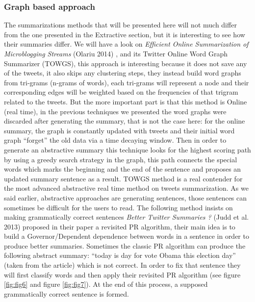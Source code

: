 \documentclass[runningheads]{llncs}
\begin{document}
\subsubsection{Graph based approach}

The summarizations methods that will be presented here will not much differ
from the one presented in the Extractive section, but it is interesting to see
how their summaries differ. We will have a look on \textit{Efficient Online
Summarization of Microblogging Streams} (Olariu 2014)
\cite{olariu_efficient_2014}, and its Twitter Online Word Graph Summarizer
(TOWGS), this approach is interesting because it does not save any of the
tweets, it also skips any clustering steps, they instead build word graphs from
tri-grams (n-grams of words), each tri-grams will represent a node and their
corresponding edges will be weighted based on the frequencies of that trigram
related to the tweets. But the more important part is that this method is
Online (real time), in the previous techniques we presented the word graphs
were discarded after generating the summary, that is not the case here: for the
online summary, the graph is constantly updated with tweets and their initial
word graph ``forget'' the old data via a time decaying window. Then in order to
generate an abstractive summary this technique looks for the highest scoring
path by using a greedy search strategy in the graph, this path connects the
special words which marks the beginning and the end of the sentence and
proposes an updated summary sentence as a result. TOWGS method is a real
contender for the most advanced abstractive real time method on tweets
summarization. As we said earlier, abstractive approaches are generating
sentences, those sentences can sometimes be difficult for the users to read.
The following method insists on making grammatically correct sentences
\textit{Better Twitter Summaries ?} (Judd et al. 2013) \cite{judd_better_2013}
proposed in their paper a revisited PR algorithm, their main idea is to build a
Governor/Dependent dependence between words in a sentence in order to produce
better summaries. Sometimes the classic PR algorithm can produce the following
abstract summary: ``today is day for vote Obama this election day'' (taken
from the article) which is not correct. In order to fix that sentence they will
first classify words and then apply their revisited PR algorithm (see figure
\ref{fig:fig6} and figure \ref{fig:fig7}). At the end of this process, a supposed
grammatically correct sentence is formed.
\end{document}
